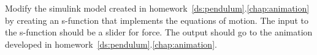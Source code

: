 Modify the simulink model created in homework~\ref{ds:pendulum}.\ref{chap:animation} by creating an s-function that implements the equations of motion.  The input to the s-function should be a slider for force.  The output should go to the animation developed in homework~\ref{ds:pendulum}.\ref{chap:animation}.


